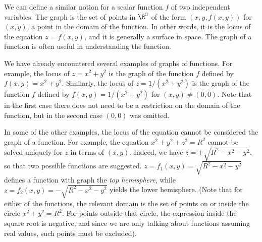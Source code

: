 We can define a similar notion for a scalar function $f$ of two
independent variables.  The graph is the
set of points in $\R^3$  of the form $(x, y, f(x,y))$
for $(x,y)$, a point in the domain of the function.  In other words,
it is the locus of the equation $z = f(x,y)$, and it is generally
a surface in space.
The graph of a function is often useful in understanding the
function.

We have already encountered several examples of graphs of functions.
For example, the locus of $z = x^2 + y^2$ is the graph of the
function $f$ defined by $f(x,y) = x^2 +y^2$.   Similarly, the locus
of $z = 1/(x^2 + y^2)$ is the graph of the function $f$ defined by
$f(x,y) = 1/(x^2 + y^2)$ for $(x,y) \not= (0,0)$. 
  Note that in the first case there does not need to be a restriction on the domain of the function, but in the second
case $(0,0)$ was omitted.  

In some of the other examples, the locus
of the equation cannot be considered the graph of a function.
For example, the equation $x^2 + y^2 + z^2 = R^2$ cannot be solved
uniquely for $z$ in terms of $(x,y)$.  Indeed, we have
$z = \pm\sqrt{R^2 - x^2 - y^2}$, so that two possible functions
are suggested.  $z = f_1(x,y) = \sqrt{R^2 - x^2 - y^2}$ 
defines a function with graph
the \emph{top hemisphere}, while $z = f_2(x,y)
= - \sqrt{R^2 - x^2 - y^2}$ yields the lower hemisphere.  (Note that
for either of the functions, the relevant domain is the set of
points on or inside the circle $x^2 + y^2 = R^2$.  For points outside
that circle, the expression inside the square root is negative, and
since we are only talking about functions assuming real values,
such points must be excluded).

